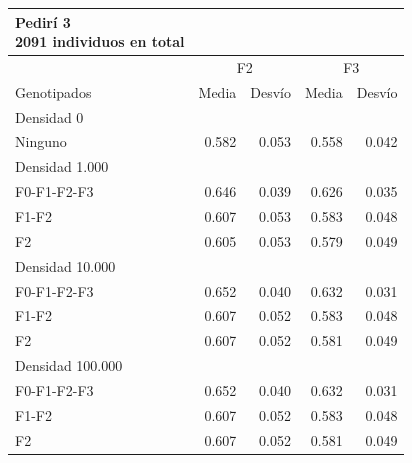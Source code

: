 \documentclass[11pt,spanish,a4paper,oneside,]{book} %
\begin{document}
\begin{longtable}{lrrrr}
\caption*{
{\large Pedirí 3} \\ 
{\small 2091 individuos en total}
} \\ 
\toprule
 & \multicolumn{2}{c}{F2} & \multicolumn{2}{c}{F3} \\ 
 \cmidrule(lr){2-3} \cmidrule(lr){4-5}
Genotipados & Media & Desvío & Media & Desvío \\ 
\midrule
\multicolumn{1}{l}{Densidad 0} \\ 
\midrule
Ninguno & 0.582 & 0.053 & 0.558 & 0.042 \\ 
\midrule
\multicolumn{1}{l}{Densidad 1.000} \\ 
\midrule
F0-F1-F2-F3 & 0.646 & 0.039 & 0.626 & 0.035 \\ 
F1-F2 & 0.607 & 0.053 & 0.583 & 0.048 \\ 
F2 & 0.605 & 0.053 & 0.579 & 0.049 \\ 
\midrule
\multicolumn{1}{l}{Densidad 10.000} \\ 
\midrule
F0-F1-F2-F3 & 0.652 & 0.040 & 0.632 & 0.031 \\ 
F1-F2 & 0.607 & 0.052 & 0.583 & 0.048 \\ 
F2 & 0.607 & 0.052 & 0.581 & 0.049 \\ 
\midrule
\multicolumn{1}{l}{Densidad 100.000} \\ 
\midrule
F0-F1-F2-F3 & 0.652 & 0.040 & 0.632 & 0.031 \\ 
F1-F2 & 0.607 & 0.052 & 0.583 & 0.048 \\ 
F2 & 0.607 & 0.052 & 0.581 & 0.049 \\ 
 \bottomrule
\end{longtable}
\captionsetup[table]{labelformat=empty,skip=1pt}
\end{document}
